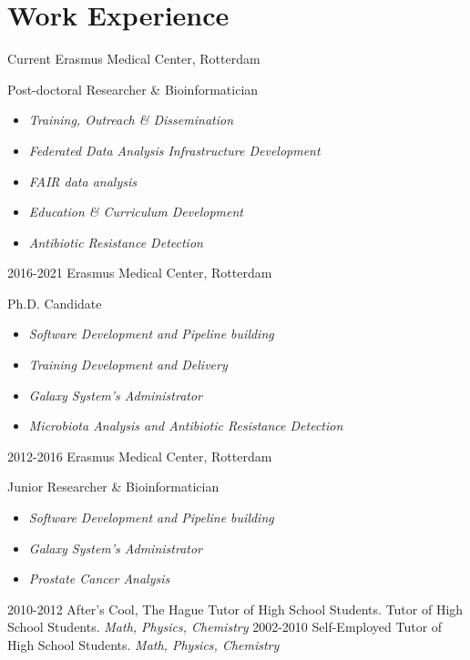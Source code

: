 \documentclass[]{shiltemann-cv}
\begin{document}
\section{Work Experience}

\begin{entrylist}
 \entry
    {Current}
    {Erasmus Medical Center, Rotterdam}
    {}
    {Post-doctoral Researcher \& Bioinformatician
     \begin{itemize}
     \item \emph{Training, Outreach \& Dissemination}
     \item \emph{Federated Data Analysis Infrastructure Development}
     \item \emph{FAIR data analysis}
     \item \emph{Education \& Curriculum Development}
     \item \emph{Antibiotic Resistance Detection}
     \end{itemize}}
   \entry
    {2016-2021}
    {Erasmus Medical Center, Rotterdam}
    {}
    {Ph.D. Candidate
     \begin{itemize}
     \item \emph{Software Development and Pipeline building}
     \item \emph{Training Development and Delivery}
     \item \emph{Galaxy System's Administrator}
     \item \emph{Microbiota Analysis and Antibiotic Resistance Detection}
     \end{itemize}}
   \entry
    {2012-2016}
    {Erasmus Medical Center, Rotterdam}
    {}
    {Junior Researcher \& Bioinformatician
     \begin{itemize}
     \item \emph{Software Development and Pipeline building}
     \item \emph{Galaxy System's Administrator}
     \item \emph{Prostate Cancer Analysis}
     \end{itemize}}
\end{entrylist}
\begin{entrylist}
  \entry
    {2010-2012}
    {After's Cool, The Hague}
    {Tutor of High School Students.}
    {Tutor of High School Students. \emph{Math, Physics, Chemistry}}
  \entry
    {2002-2010}
    {Self-Employed}
    {}
    {Tutor of High School Students. \emph{Math, Physics, Chemistry}}
\end{entrylist}
\end{document}
